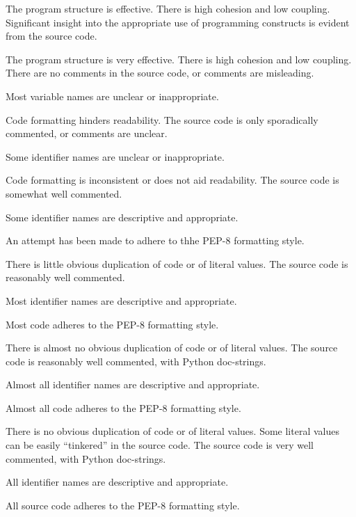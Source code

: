 \documentclass{../fal_assignment}
\begin{document}
\begin{markingrubric}
            \par The program structure is effective. There is high cohesion and low coupling.
        \grade Significant insight into the appropriate use of programming constructs is evident from the source code.
            \par The program structure is very effective. There is high cohesion and low coupling.
%
        \grade\fail There are no comments in the source code, or comments are misleading.
            \par Most variable names are unclear or inappropriate.
            \par Code formatting hinders readability.
        \grade The source code is only sporadically commented, or comments are unclear.
            \par Some identifier names are unclear or inappropriate.
            \par Code formatting is inconsistent or does not aid readability.
        \grade The source code is somewhat well commented.
            \par Some identifier names are descriptive and appropriate.
            \par An attempt has been made to adhere to thhe PEP-8 formatting style.
             \par There is little obvious duplication of code or of literal values.           
        \grade The source code is reasonably well commented.
            \par Most identifier names are descriptive and appropriate.
            \par Most code adheres to the PEP-8 formatting style.
             \par There is almost no obvious duplication of code or of literal values.   
        \grade The source code is reasonably well commented, with Python doc-strings.
            \par Almost all identifier names are descriptive and appropriate.
            \par Almost all code adheres to the PEP-8 formatting style.
             \par There is no obvious duplication of code or of literal values. Some literal values can be easily ``tinkered'' in the source code. 
        \grade The source code is very well commented, with Python doc-strings.
            \par All identifier names are descriptive and appropriate.
            \par All source code adheres to the PEP-8 formatting style.

\end{markingrubric}
\end{document}

